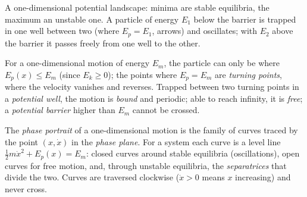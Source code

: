 \begin{omfigure}

{\small A one-dimensional potential landscape: minima are stable
equilibria, the maximum an unstable one. A particle of energy $E_1$
below the barrier is trapped in one well between two \emph{} (where $E_p = E_1$, arrows) and oscillates; with $E_2$ above
the barrier it passes freely from one well to the other.}
\end{omfigure}

\begin{definition}\label{def:b1:work-and-energy:turning}
For a  one-dimensional motion of energy $E_m$, the particle
can only be where $E_p(x) \leq E_m$ (since $E_k \geq 0$); the points where
$E_p = E_m$ are \emph{turning points}, where the velocity vanishes and
reverses. Trapped between two turning points in a \emph{potential well},
the motion is \emph{bound} and periodic; able to reach infinity, it is
\emph{free}; a \emph{potential barrier} higher than $E_m$ cannot be
crossed.
\end{definition}

\begin{definition}\label{def:b1:work-and-energy:phase}
The \emph{phase portrait} of a one-dimensional motion is the family of
curves traced by the point $(x, \dot x)$ in the \emph{phase plane}. For
a  system each curve is a level line $\tfrac12 m\dot x^2 +
E_p(x) = E_m$: closed curves around stable equilibria (oscillations),
open curves for free motion, and, through unstable equilibria, the
\emph{separatrices} that divide the two. Curves are traversed clockwise
($\dot x > 0$ means $x$ increasing) and never cross.
\end{definition}

